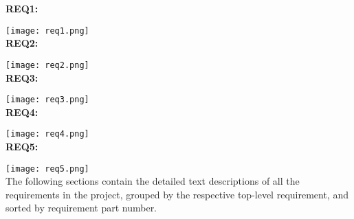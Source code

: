 \textbf{REQ1:}

\texttt{[image: req1.png]}\\

\textbf{REQ2:}

\texttt{[image: req2.png]}\\

\textbf{REQ3:}

\texttt{[image: req3.png]}\\

\textbf{REQ4:}

\texttt{[image: req4.png]}\\

\textbf{REQ5:}

\texttt{[image: req5.png]}\\

The following sections contain the detailed text descriptions of all the requirements in the project, grouped by the respective top-level requirement, and sorted by requirement part number.










